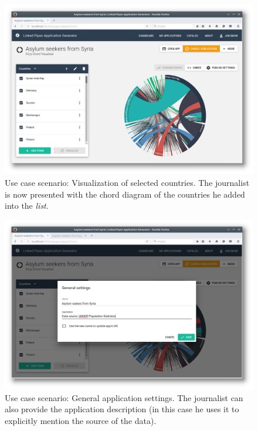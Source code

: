 \begin{figure}
	\centering
	\includegraphics[width=145mm]{img/05_scenario_06_ready_application}
	\caption{Use case scenario: Visualization of selected countries. The journalist is now presented with the chord diagram of the countries he added into the \emph{list}.}
	\label{fig:scenario-06-ready application}
\end{figure}

\begin{figure}
	\centering
	\includegraphics[width=145mm]{img/05_scenario_07_general_settings}
	\caption{Use case scenario: General application settings. The journalist can also provide the application description (in this case he uses it to explicitly mention the source of the data).}
	\label{fig:scenario-07-general-settings}
\end{figure}

